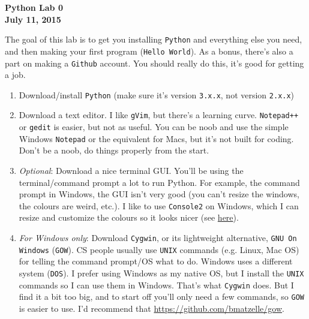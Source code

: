 \documentclass[letterpaper,14pt,oneside]{extarticle}
\newenvironment{nscenter}
	{\parskip=0pt\par\nopagebreak\centering}
	{\par\noindent\ignorespacesafterend}
\begin{document}
\begin{nscenter}
\Huge \bfseries Python Lab 0 \\
\vspace{6pt}
\Large \bfseries July 11, 2015\\
\end{nscenter}

\vspace{20pt}

The goal of this lab is to get you installing \texttt{Python} and everything else you need, and then making your first program (\texttt{Hello World}). As a bonus, there's also a part on making a \texttt{Github} account. You should really do this, it's good for getting a job.

\begin{enumerate}[leftmargin=*]
\item Download/install \texttt{Python} (make sure it's version \texttt{3.x.x}, not version \texttt{2.x.x})

\item Download a text editor. I like \texttt{gVim}, but there's a learning curve. \texttt{Notepad++} or \texttt{gedit} is easier, but not as useful. You can be noob and use the simple Windows \texttt{Notepad} or the equivalent for Macs, but it's not built for coding. Don't be a noob, do things properly from the start.

\item \textit{Optional}: Download a nice terminal GUI. You'll be using the terminal/command prompt a lot to run Python. For example, the command prompt in Windows, the GUI isn't very good (you can't resize the windows, the colours are weird, etc.). I like to use \texttt{Console2} on Windows, which I can resize and customize the colours so it looks nicer (see \href{http://www.hanselman.com/blog/Console2ABetterWindowsCommandPrompt.aspx}{here}).

\item \textit{For Windows only}: Download \texttt{Cygwin}, or its lightweight alternative, \texttt{GNU On Windows} (\texttt{GOW}). CS people usually use \texttt{UNIX} commands (e.g. Linux, Mac OS) for telling the command prompt/OS what to do. Windows uses a different system (\texttt{DOS}). I prefer using Windows as my native OS, but I install the \texttt{UNIX} commands so I can use them in Windows. That's what \texttt{Cygwin} does. But I find it a bit too big, and to start off you'll only need a few commands, so \texttt{GOW} is easier to use. I'd recommend that \url{https://github.com/bmatzelle/gow}.


\end{enumerate}
\end{document}
